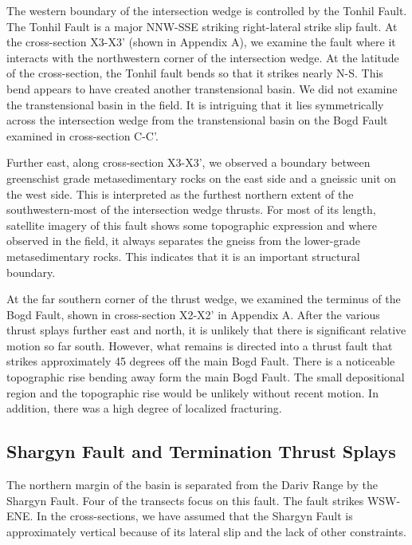 The western boundary of the intersection wedge is controlled by the Tonhil Fault. The Tonhil Fault is a major NNW-SSE striking right-lateral strike slip fault. At the cross-section X3-X3' (shown in Appendix A), we examine the fault where it interacts with the northwestern corner of the intersection wedge. At the latitude of the cross-section, the Tonhil fault bends so that it strikes nearly N-S. This bend appears to have created another transtensional basin. We did not examine the transtensional basin in the field. It is intriguing that it lies symmetrically across the intersection wedge from the transtensional basin on the Bogd Fault examined in cross-section C-C'. 

Further east, along cross-section X3-X3', we observed a boundary between greenschist grade metasedimentary rocks on the east side and a gneissic unit on the west side. This is interpreted as the furthest northern extent of the southwestern-most of the intersection wedge thrusts. For most of its length, satellite imagery of this fault shows some topographic expression and where observed in the field, it always separates the gneiss from the lower-grade metasedimentary rocks. This indicates that it is an important structural boundary. 

At the far southern corner of the thrust wedge, we examined the terminus of the Bogd Fault, shown in cross-section X2-X2' in Appendix A. After the various thrust splays further east and north, it is unlikely that there is significant relative motion so far south. However, what remains is directed into a thrust fault that strikes approximately 45 degrees off the main Bogd Fault. There is a noticeable topographic rise bending away form the main Bogd Fault. The small depositional region and the topographic rise would be unlikely without recent motion. In addition, there was a high degree of localized fracturing.

\subsection{Shargyn Fault and Termination Thrust Splays}

The northern margin of the basin is separated from the Dariv Range by the Shargyn Fault. Four of the transects focus on this fault. The fault strikes WSW-ENE. In the cross-sections, we have assumed that the Shargyn Fault is approximately vertical because of its lateral slip and the lack of other constraints. 

